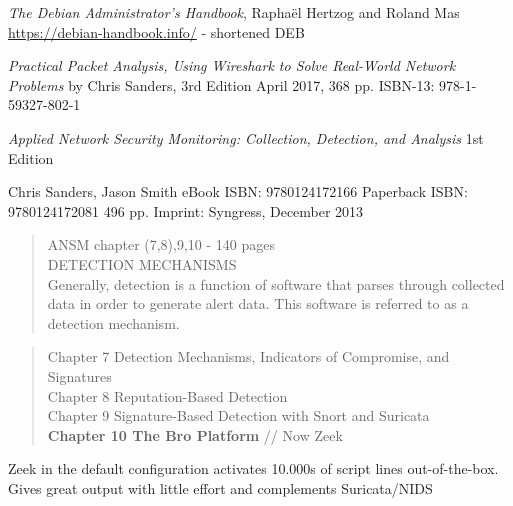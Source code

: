 \documentclass[Screen16to9,17pt]{foils}
\begin{document}


\emph{The Debian Administrator’s Handbook}, Raphaël Hertzog and Roland Mas\\
\url{https://debian-handbook.info/} - shortened DEB





\emph{Practical Packet Analysis,
Using Wireshark to Solve Real-World Network Problems}
by Chris Sanders, 3rd Edition
April 2017, 368 pp.
ISBN-13:
978-1-59327-802-1





\emph{Applied Network Security Monitoring: Collection, Detection, and Analysis}
1st Edition

Chris Sanders, Jason Smith
eBook ISBN: 9780124172166
Paperback ISBN: 9780124172081 496 pp.
Imprint: Syngress, December 2013

{\footnotesize{}}



\begin{quote}
ANSM chapter (7,8),9,10 - 140 pages\\
DETECTION MECHANISMS\\
Generally, detection is a function of software that parses through collected data in order to generate alert data. This software is referred to as a detection mechanism.
\end{quote}

\begin{quote}
Chapter 7 Detection Mechanisms, Indicators of Compromise, and Signatures\\
Chapter 8 Reputation-Based Detection\\
Chapter 9 Signature-Based Detection with Snort and Suricata\\{\bf
Chapter 10 The Bro Platform} // Now Zeek
\end{quote}

Zeek in the default configuration activates 10.000s of script lines out-of-the-box.\\
Gives great output with little effort and complements Suricata/NIDS
\end{document}
